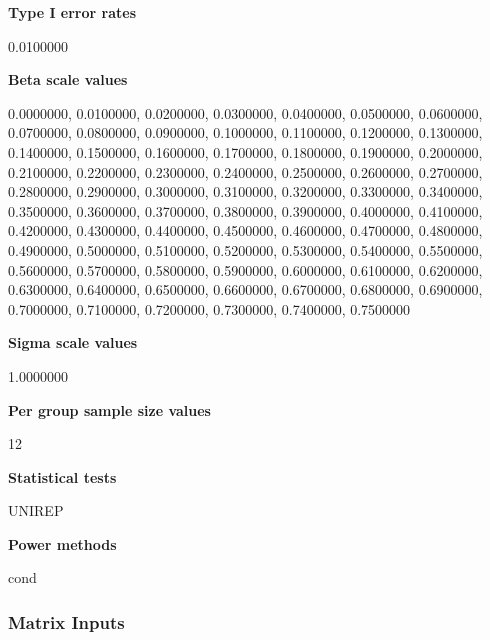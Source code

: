 \documentclass{glimmpse-report}
\begin{document}
{\bf Type I error rates}

0.0100000

{\bf Beta scale values}

0.0000000, 0.0100000, 0.0200000, 0.0300000, 0.0400000, 0.0500000, 0.0600000, 0.0700000, 0.0800000, 0.0900000, 0.1000000, 0.1100000, 0.1200000, 0.1300000, 0.1400000, 0.1500000, 0.1600000, 0.1700000, 0.1800000, 0.1900000, 0.2000000, 0.2100000, 0.2200000, 0.2300000, 0.2400000, 0.2500000, 0.2600000, 0.2700000, 0.2800000, 0.2900000, 0.3000000, 0.3100000, 0.3200000, 0.3300000, 0.3400000, 0.3500000, 0.3600000, 0.3700000, 0.3800000, 0.3900000, 0.4000000, 0.4100000, 0.4200000, 0.4300000, 0.4400000, 0.4500000, 0.4600000, 0.4700000, 0.4800000, 0.4900000, 0.5000000, 0.5100000, 0.5200000, 0.5300000, 0.5400000, 0.5500000, 0.5600000, 0.5700000, 0.5800000, 0.5900000, 0.6000000, 0.6100000, 0.6200000, 0.6300000, 0.6400000, 0.6500000, 0.6600000, 0.6700000, 0.6800000, 0.6900000, 0.7000000, 0.7100000, 0.7200000, 0.7300000, 0.7400000, 0.7500000

{\bf Sigma scale values}

1.0000000

{\bf Per group sample size values}

12

{\bf Statistical tests}

UNIREP

{\bf Power methods}

cond

\subsubsection{Matrix Inputs}
\end{document}
